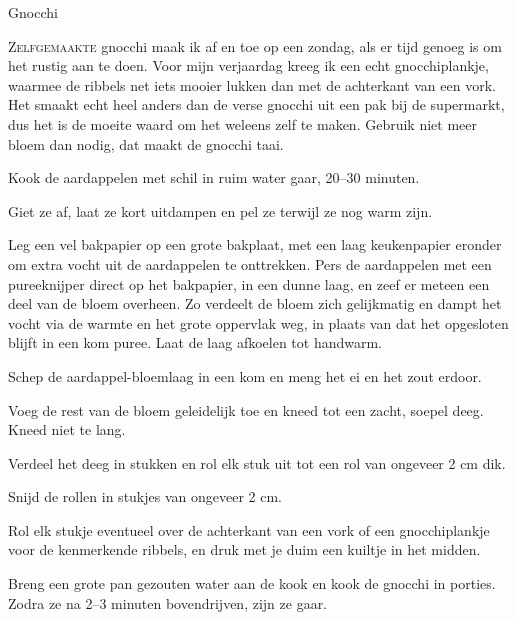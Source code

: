 \begin{recipe}{Gnocchi}
\label{recipe:gnocchi}


\lettrine{Z}{elfgemaakte} gnocchi maak ik af en toe op een zondag, als er
tijd genoeg is om het rustig aan te doen. Voor mijn verjaardag kreeg ik een
echt gnocchiplankje, waarmee de ribbels net iets mooier lukken dan met de
achterkant van een vork. Het smaakt echt heel anders dan de verse gnocchi
uit een pak bij de supermarkt, dus het is de moeite waard om het weleens
zelf te maken. Gebruik niet meer bloem dan nodig, dat maakt de gnocchi taai.

\begin{ingredients}
\end{ingredients}

\begin{steps}
  \item Kook de aardappelen met schil in ruim water gaar, 20--30 minuten.
  \item Giet ze af, laat ze kort uitdampen en pel ze terwijl ze nog warm
        zijn.
  \item Leg een vel bakpapier op een grote bakplaat, met een laag
        keukenpapier eronder om extra vocht uit de aardappelen te
        onttrekken. Pers de aardappelen met een pureeknijper direct op het
        bakpapier, in een dunne laag, en zeef er meteen een deel van de
        bloem overheen. Zo verdeelt de bloem zich gelijkmatig en dampt het
        vocht via de warmte en het grote oppervlak weg, in plaats van dat
        het opgesloten blijft in een kom puree. Laat de laag afkoelen tot
        handwarm.
  \item Schep de aardappel-bloemlaag in een kom en meng het ei en het zout
        erdoor.
  \item Voeg de rest van de bloem geleidelijk toe en kneed tot een zacht,
        soepel deeg. Kneed niet te lang.
  \item Verdeel het deeg in stukken en rol elk stuk uit tot een rol van
        ongeveer 2 cm dik.
  \item Snijd de rollen in stukjes van ongeveer 2 cm.
  \item Rol elk stukje eventueel over de achterkant van een vork of een
        gnocchiplankje voor de kenmerkende ribbels, en druk met je duim een
        kuiltje in het midden.
  \item Breng een grote pan gezouten water aan de kook en kook de gnocchi in
        porties. Zodra ze na 2--3 minuten bovendrijven, zijn ze gaar.
\end{steps}

\end{recipe}
